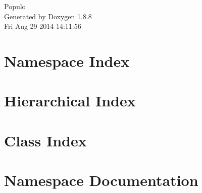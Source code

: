 \documentclass[twoside]{book}
\newcommand{\+}{\discretionary{\mbox{\scriptsize$\hookleftarrow$}}{}{}}
\newcommand{\clearemptydoublepage}{%
  \newpage{\pagestyle{empty}\cleardoublepage}%
}
\begin{document}
\hypersetup{pageanchor=false,
             bookmarks=true,
             bookmarksnumbered=true,
             pdfencoding=unicode
            }
\begin{titlepage}
\vspace*{7cm}
\begin{center}%
{\Large Populo }\\
\vspace*{1cm}
{\large Generated by Doxygen 1.8.8}\\
\vspace*{0.5cm}
{\small Fri Aug 29 2014 14:11:56}\\
\end{center}
\end{titlepage}
\clearemptydoublepage
\tableofcontents
\clearemptydoublepage
{}
\hypersetup{pageanchor=true}

\chapter{Namespace Index}

\chapter{Hierarchical Index}

\chapter{Class Index}

\chapter{Namespace Documentation}







\end{document}
